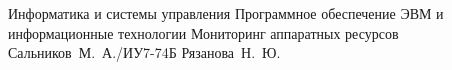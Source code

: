 \documentclass{bmstu}
\begin{document}
	
	\makecourseworktitle
	{Информатика и системы управления}
	{Программное обеспечение ЭВМ и информационные технологии}
	{Мониторинг аппаратных ресурсов}
	{Сальников~М.~А./ИУ7-74Б}
	{Рязанова~Н.~Ю.}
	{}
	
	\setcounter{page}{3}

	\maketableofcontents
	
	
	
	
	
	
	
	
	
	
	\makebibliography
	
	
	
	
\end{document}
